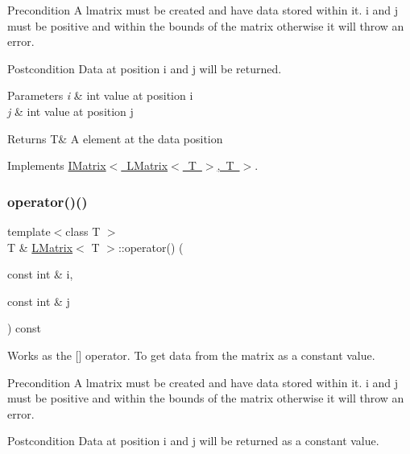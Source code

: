 \begin{DoxyPrecond}{Precondition}
A lmatrix must be created and have data stored within it. i and j must be positive and within the bounds of the matrix otherwise it will throw an error. 
\end{DoxyPrecond}
\begin{DoxyPostcond}{Postcondition}
Data at position i and j will be returned.
\end{DoxyPostcond}

\begin{DoxyParams}{Parameters}
{\em i} & int value at position i \\
\hline
{\em j} & int value at position j \\
\hline
\end{DoxyParams}
\begin{DoxyReturn}{Returns}
T\& A element at the data position 
\end{DoxyReturn}


Implements \mbox{\hyperlink{class_i_matrix_a1e4246d163aaca1b224dec8839645ea9}{I\+Matrix$<$ L\+Matrix$<$ T $>$, T $>$}}.

\mbox{\label{class_l_matrix_ae9d404d99117892edd2fbfddfaf929f5}} 
\subsubsection{\texorpdfstring{operator()()}{operator()()}\hspace{0.1cm}{\footnotesize\ttfamily [2/2]}}
{\footnotesize\ttfamily template$<$class T $>$ \\
T \& \mbox{\hyperlink{class_l_matrix}{L\+Matrix}}$<$ T $>$\+::operator() (\begin{DoxyParamCaption}\item[{const int \&}]{i,  }\item[{const int \&}]{j }\end{DoxyParamCaption}) const\hspace{0.3cm}{\ttfamily [virtual]}}



Works as the \mbox{[}\mbox{]} operator. To get data from the matrix as a constant value. 

\begin{DoxyPrecond}{Precondition}
A lmatrix must be created and have data stored within it. i and j must be positive and within the bounds of the matrix otherwise it will throw an error. 
\end{DoxyPrecond}
\begin{DoxyPostcond}{Postcondition}
Data at position i and j will be returned as a constant value.
\end{DoxyPostcond}

